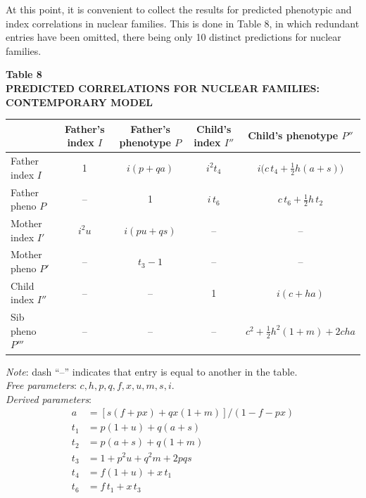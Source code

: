 ﻿\documentclass[12pt]{article}
\begin{document}
At this point, it is convenient to collect the results for predicted phenotypic and index correlations in nuclear families. This is done in Table 8, in which redundant entries have been omitted, there being only 10 distinct predictions for nuclear families.

\begin{center}
\textbf{Table 8}\\
\textbf{PREDICTED CORRELATIONS FOR NUCLEAR FAMILIES: CONTEMPORARY MODEL}
\end{center}
\begin{center}
\small
\begin{tabular}{l c c c c}
\hline
 & Father's index $I$ & Father's phenotype $P$ & Child's index $I''$ & Child's phenotype $P''$ \\
\hline
Father index $I$ & 1 & $i(p+qa)$ & $i^2 t_4$ & $i\big(c\,t_4 + \tfrac12 h(a+s)\big)$ \\
Father pheno $P$ & -- & 1 & $i\,t_6$ & $c\,t_6 + \tfrac12 h\,t_2$ \\
Mother index $I'$ & $i^2 u$ & $i(pu+qs)$ & -- & -- \\
Mother pheno $P'$ & -- & $t_3-1$ & -- & -- \\
Child index $I''$ & -- & -- & 1 & $i(c+ha)$ \\
Sib pheno $P'''$ & -- & -- & -- & $c^2+\tfrac12 h^2(1+m)+2cha$ \\
\hline
\end{tabular}
\end{center}
\emph{Note}: dash ``--'' indicates that entry is equal to another in the table.\\
\emph{Free parameters}: $c, h, p, q, f, x, u, m, s, i$.\\
\emph{Derived parameters}:
\begin{align*}
a &= [s(f+px) + qx(1+m)]/(1-f-px) \\
t_1 &= p(1+u) + q(a+s) \\
t_2 &= p(a+s) + q(1+m) \\
t_3 &= 1 + p^2u + q^2m + 2pqs \\
t_4 &= f(1+u) + x\,t_1 \\
t_6 &= f\,t_1 + x\,t_3
\end{align*}
\end{document}
